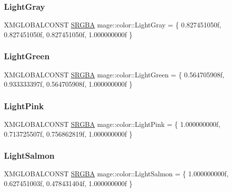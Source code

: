 \hypertarget{namespacemage_1_1color_a6af6bd3be5ccf3d69dc1635bfb2dc8d5}{}\label{namespacemage_1_1color_a6af6bd3be5ccf3d69dc1635bfb2dc8d5} 
\subsubsection{\texorpdfstring{Light\+Gray}{LightGray}}
{\footnotesize\ttfamily X\+M\+G\+L\+O\+B\+A\+L\+C\+O\+N\+ST \hyperlink{structmage_1_1_s_r_g_b_a}{S\+R\+G\+BA} mage\+::color\+::\+Light\+Gray = \{ 0.\+827451050f, 0.\+827451050f, 0.\+827451050f, 1.\+000000000f \}}

\hypertarget{namespacemage_1_1color_ac0cc82492983e41085eec8cb1dce68c0}{}\label{namespacemage_1_1color_ac0cc82492983e41085eec8cb1dce68c0} 
\subsubsection{\texorpdfstring{Light\+Green}{LightGreen}}
{\footnotesize\ttfamily X\+M\+G\+L\+O\+B\+A\+L\+C\+O\+N\+ST \hyperlink{structmage_1_1_s_r_g_b_a}{S\+R\+G\+BA} mage\+::color\+::\+Light\+Green = \{ 0.\+564705908f, 0.\+933333397f, 0.\+564705908f, 1.\+000000000f \}}

\hypertarget{namespacemage_1_1color_a4269e5358f4edf08ae4b740c22b014e0}{}\label{namespacemage_1_1color_a4269e5358f4edf08ae4b740c22b014e0} 
\subsubsection{\texorpdfstring{Light\+Pink}{LightPink}}
{\footnotesize\ttfamily X\+M\+G\+L\+O\+B\+A\+L\+C\+O\+N\+ST \hyperlink{structmage_1_1_s_r_g_b_a}{S\+R\+G\+BA} mage\+::color\+::\+Light\+Pink = \{ 1.\+000000000f, 0.\+713725507f, 0.\+756862819f, 1.\+000000000f \}}

\hypertarget{namespacemage_1_1color_a1dee89ee5a62d0b75f332a32a5bcf89e}{}\label{namespacemage_1_1color_a1dee89ee5a62d0b75f332a32a5bcf89e} 
\subsubsection{\texorpdfstring{Light\+Salmon}{LightSalmon}}
{\footnotesize\ttfamily X\+M\+G\+L\+O\+B\+A\+L\+C\+O\+N\+ST \hyperlink{structmage_1_1_s_r_g_b_a}{S\+R\+G\+BA} mage\+::color\+::\+Light\+Salmon = \{ 1.\+000000000f, 0.\+627451003f, 0.\+478431404f, 1.\+000000000f \}}


